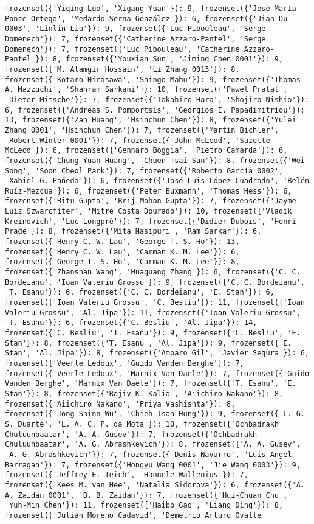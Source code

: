 \documentclass[11pt]{article}
\begin{document}
\begin{verbatim}
frozenset({'Yiqing Luo', 'Xigang Yuan'}): 9, frozenset({'José María Ponce-Ortega', 'Medardo Serna-González'}): 6, frozenset({'Jian Du 0003', 'Linlin Liu'}): 9, frozenset({'Luc Pibouleau', 'Serge Domenech'}): 7, frozenset({'Catherine Azzaro-Pantel', 'Serge Domenech'}): 7, frozenset({'Luc Pibouleau', 'Catherine Azzaro-Pantel'}): 8, frozenset({'Youxian Sun', 'Jiming Chen 0001'}): 9, frozenset({'M. Alamgir Hossain', 'Li Zhang 0013'}): 8, frozenset({'Kotaro Hirasawa', 'Shingo Mabu'}): 9, frozenset({'Thomas A. Mazzuchi', 'Shahram Sarkani'}): 10, frozenset({'Pawel Pralat', 'Dieter Mitsche'}): 7, frozenset({'Takahiro Hara', 'Shojiro Nishio'}): 6, frozenset({'Andreas S. Pomportsis', 'Georgios I. Papadimitriou'}): 13, frozenset({'Zan Huang', 'Hsinchun Chen'}): 8, frozenset({'Yulei Zhang 0001', 'Hsinchun Chen'}): 7, frozenset({'Martin Bichler', 'Robert Winter 0001'}): 7, frozenset({'John McLeod', 'Suzette McLeod'}): 6, frozenset({'Gennaro Boggia', 'Pietro Camarda'}): 6, frozenset({'Chung-Yuan Huang', 'Chuen-Tsai Sun'}): 8, frozenset({'Wei Song', 'Soon Cheol Park'}): 7, frozenset({'Roberto García 0002', 'Xabiel G. Pañeda'}): 6, frozenset({'José Luis López Cuadrado', 'Belén Ruíz-Mezcua'}): 6, frozenset({'Peter Buxmann', 'Thomas Hess'}): 6, frozenset({'Ritu Gupta', 'Brij Mohan Gupta'}): 7, frozenset({'Jayme Luiz Szwarcfiter', 'Mitre Costa Dourado'}): 10, frozenset({'Vladik Kreinovich', 'Luc Longpré'}): 7, frozenset({'Didier Dubois', 'Henri Prade'}): 8, frozenset({'Mita Nasipuri', 'Ram Sarkar'}): 6, frozenset({'Henry C. W. Lau', 'George T. S. Ho'}): 13, frozenset({'Henry C. W. Lau', 'Carman K. M. Lee'}): 6, frozenset({'George T. S. Ho', 'Carman K. M. Lee'}): 8, frozenset({'Zhanshan Wang', 'Huaguang Zhang'}): 6, frozenset({'C. C. Bordeianu', 'Ioan Valeriu Grossu'}): 9, frozenset({'C. C. Bordeianu', 'T. Esanu'}): 6, frozenset({'C. C. Bordeianu', 'E. Stan'}): 6, frozenset({'Ioan Valeriu Grossu', 'C. Besliu'}): 11, frozenset({'Ioan Valeriu Grossu', 'Al. Jipa'}): 11, frozenset({'Ioan Valeriu Grossu', 'T. Esanu'}): 6, frozenset({'C. Besliu', 'Al. Jipa'}): 14, frozenset({'C. Besliu', 'T. Esanu'}): 9, frozenset({'C. Besliu', 'E. Stan'}): 8, frozenset({'T. Esanu', 'Al. Jipa'}): 9, frozenset({'E. Stan', 'Al. Jipa'}): 8, frozenset({'Amparo Gil', 'Javier Segura'}): 6, frozenset({'Veerle Ledoux', 'Guido Vanden Berghe'}): 7, frozenset({'Veerle Ledoux', 'Marnix Van Daele'}): 7, frozenset({'Guido Vanden Berghe', 'Marnix Van Daele'}): 7, frozenset({'T. Esanu', 'E. Stan'}): 8, frozenset({'Rajiv K. Kalia', 'Aiichiro Nakano'}): 8, frozenset({'Aiichiro Nakano', 'Priya Vashishta'}): 8, frozenset({'Jong-Shinn Wu', 'Chieh-Tsan Hung'}): 9, frozenset({'L. G. S. Duarte', 'L. A. C. P. da Mota'}): 10, frozenset({'Ochbadrakh Chuluunbaatar', 'A. A. Gusev'}): 7, frozenset({'Ochbadrakh Chuluunbaatar', 'A. G. Abrashkevich'}): 8, frozenset({'A. A. Gusev', 'A. G. Abrashkevich'}): 7, frozenset({'Denis Navarro', 'Luis Angel Barragan'}): 7, frozenset({'Hongyu Wang 0001', 'Jie Wang 0003'}): 9, frozenset({'Jeffrey E. Teich', 'Hannele Wallenius'}): 7, frozenset({'Kees M. van Hee', 'Natalia Sidorova'}): 6, frozenset({'A. A. Zaidan 0001', 'B. B. Zaidan'}): 7, frozenset({'Hui-Chuan Chu', 'Yuh-Min Chen'}): 11, frozenset({'Haibo Gao', 'Liang Ding'}): 8, frozenset({'Julián Moreno Cadavid', 'Demetrio Arturo Ovalle 
\end{verbatim}
\end{document}
